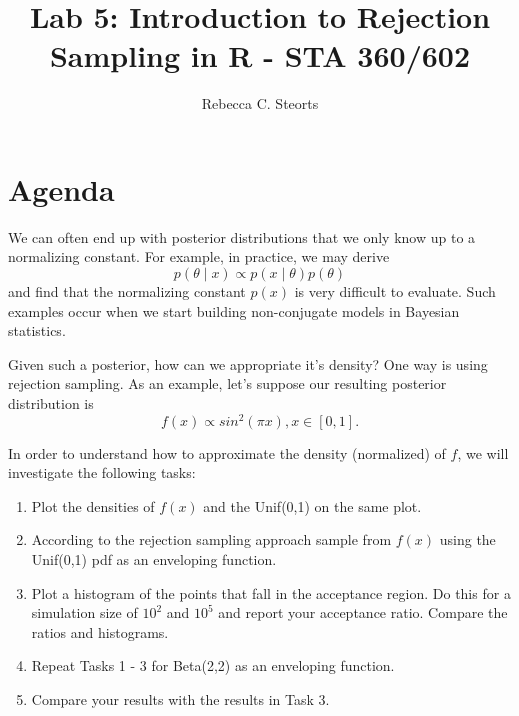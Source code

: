 \documentclass{article}
\begin{document}
\title{Lab 5: Introduction to Rejection Sampling in \textsf{R} - STA 360/602}
\author{Rebecca C. Steorts}
\date{}
\maketitle


\section{Agenda}

We can often end up with posterior distributions that we only know up to a normalizing constant. For example, in practice, we may derive $$p(\theta \mid x) \propto p(x\mid \theta) p(\theta)$$ and find that the normalizing constant $p(x)$ is very difficult to evaluate. Such examples occur when we start building non-conjugate models in Bayesian statistics. 

Given such a posterior, how can we appropriate it's density? One way is using rejection sampling. As an example, let's suppose our resulting posterior distribution is 
$$f(x) \propto sin^2(\pi x), x \in [0,1].$$

In order to understand how to approximate the density (normalized) of $f$, we will investigate the following tasks:

\begin{enumerate}
\item Plot the densities of $f(x)$ and the Unif(0,1) on the same plot. 
\item According to the rejection sampling approach sample from $f(x)$ using the Unif(0,1) pdf as an enveloping function.
\item Plot a histogram of the points that fall in the acceptance region. Do this for a simulation size of $10^2$ and $10^5$ and report your acceptance ratio. Compare the ratios and histograms.
\item Repeat Tasks 1 - 3 for  Beta(2,2) as an enveloping function. 
\item Compare your results with the results in Task 3.
\end{enumerate}
\end{document}
